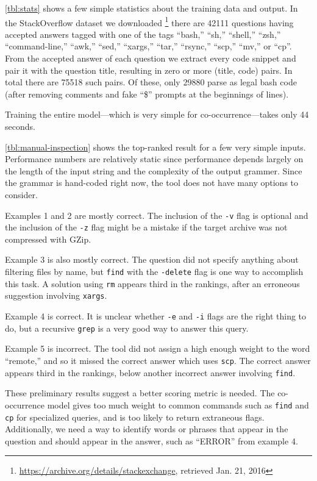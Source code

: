 \autoref{tbl:stats} shows a few simple statistics about the training data and
output. In the StackOverflow dataset we downloaded%
\footnote{\url{https://archive.org/details/stackexchange}, retrieved Jan. 21,
2016} there are 42111 questions having accepted answers tagged with one of the
tags ``bash,'' ``sh,'' ``shell,'' ``zsh,'' ``command-line,'' ``awk,'' ``sed,''
``xargs,'' ``tar,'' ``rsync,'' ``scp,'' ``mv,'' or ``cp''. From the accepted
answer of each question we extract every code snippet and pair it with the
question title, resulting in zero or more (title, code) pairs. In total there
are 75518 such pairs. Of these, only 29880 parse as legal bash code (after
removing comments and fake ``\$'' prompts at the beginnings of lines).

Training the entire model---which is very simple for co-occurrence---takes only
44 seconds.

\autoref{tbl:manual-inspection} shows the top-ranked result for a few very
simple inputs. Performance numbers are relatively static since performance
depends largely on the length of the input string and the complexity of the
output grammer. Since the grammar is hand-coded right now, the tool does not
have many options to consider.

Examples 1 and 2 are mostly correct. The inclusion of the \texttt{-v} flag is
optional and the inclusion of the \texttt{-z} flag might be a mistake if the
target archive was not compressed with GZip.

Example 3 is also mostly correct. The question did not specify anything about
filtering files by name, but \texttt{find} with the \texttt{-delete} flag is
one way to accomplish this task. A solution using \texttt{rm} appears third in
the rankings, after an erroneous suggestion involving \texttt{xargs}.

Example 4 is correct. It is unclear whether \texttt{-e} and \texttt{-i} flags
are the right thing to do, but a recursive \texttt{grep} is a very good way to
answer this query.

Example 5 is incorrect. The tool did not assign a high enough weight to the word
``remote,'' and so it missed the correct answer which uses \texttt{scp}. The
correct answer appears third in the rankings, below another incorrect answer
involving \texttt{find}.

These preliminary results suggest a better scoring metric is needed. The
co-occurrence model gives too much weight to common commands such as
\texttt{find} and \texttt{cp} for specialized queries, and is too likely to
return extraneous flags. Additionally, we need a way to identify words or
phrases that appear in the question and should appear in the answer, such as
``ERROR'' from example 4.


